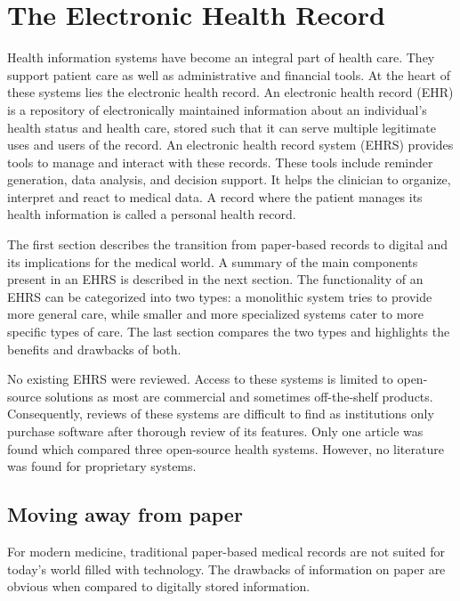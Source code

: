 \section{The Electronic Health Record}\label{background}

Health information systems have become an integral part of health care. They support patient care as well as administrative and financial tools. At the heart of these systems lies the electronic health record. An electronic health record (EHR) is a repository of electronically maintained information about an individual's health status and health care, stored such that it can serve multiple legitimate uses and users of the record\cite{biomedical_informatics}. An electronic health record system (EHRS) provides tools to manage and interact with these records. These tools include reminder generation, data analysis, and decision support. It helps the clinician to organize, interpret and react to medical data. A record where the patient manages its health information is called a personal health record\cite{tang2006personal}.

The first section describes the transition from paper-based records to digital and its implications for the medical world. A summary of the main components present in an EHRS is described in the next section. The functionality of an EHRS can be categorized into two types: a monolithic system tries to provide more general care, while smaller and more specialized systems cater to more specific types of care. The last section compares the two types and highlights the benefits and drawbacks of both.

No existing EHRS were reviewed. Access to these systems is limited to open-source solutions as most are commercial and sometimes off-the-shelf products. Consequently, reviews of these systems are difficult to find as institutions only purchase software after thorough review of its features. Only one article was found which compared three open-source health systems\cite{de2012overview}. However, no literature was found for proprietary systems.

    \subsection{Moving away from paper}\label{2_ehrs_paper}

    For modern medicine, traditional paper-based medical records are not suited for today's world filled with technology. The drawbacks of information on paper are obvious when compared to digitally stored information.


